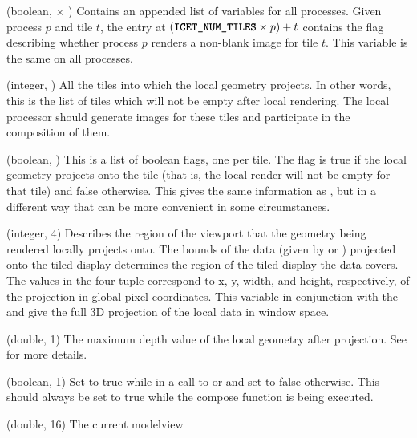 \begin{Description}[xxxxxxxx]
\item[\CEnum{ICET\_ALL\_CONTAINED\_TILES\_MASKS}] (boolean,
   $\times$ ) Contains
  an appended list of  variables for
  all processes.  Given process $p$ and tile $t$, the entry at
  $(\CEnum{ICET\_NUM\_TILES} \times p)+t$ contains the flag describing
  whether process $p$ renders a non-blank image for tile $t$.  This
  variable is the same on all processes.
\item[\CEnum{ICET\_CONTAINED\_TILES\_LIST}] (integer,
  ) All the tiles into which the local
  geometry projects.  In other words, this is the list of tiles which will
  not be empty after local rendering.  The local processor should generate
  images for these tiles and participate in the composition of them.
\item[\CEnum{ICET\_CONTAINED\_TILES\_MASK}] (boolean,
  ) This is a list of boolean flags, one per tile.
  The flag is true if the local geometry projects onto the tile (that is,
  the local render will not be empty for that tile) and false otherwise.
  This gives the same information as ,
  but in a different way that can be more convenient in some circumstances.
\item[\CEnum{ICET\_CONTAINED\_VIEWPORT}] (integer, 4) Describes the region
  of the viewport that the geometry being rendered locally projects onto.
  The bounds of the data (given by  or
  ) projected onto the tiled display determines
  the region of the tiled display the data covers.  The values in the
  four-tuple correspond to x, y, width, and height, respectively, of the
  projection in global pixel coordinates.  This variable in conjunction
  with the  and  give the
  full 3D projection of the local data in window space.
\item[\CEnum{ICET\_FAR\_DEPTH}] (double, 1) The maximum depth value of the
  local geometry after projection.  See 
  for more details.
\item[\CEnum{ICET\_IS\_DRAWING\_FRAME}] (boolean, 1) Set to true while in a
  call to  or  and set to false
  otherwise.  This should always be set to true while the compose function
  is being executed.
\item[\CEnum{ICET\_MODELVIEW\_MATRIX}] (double, 16) The current modelview

\end{Description}
